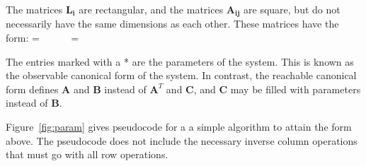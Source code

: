 The matrices $\mathbf{L_i}$ are rectangular, and the matrices
$\mathbf{A_{ij}}$ are square, but do not necessarily have the same
dimensions as each other. These matrices have the form: \vspace{-3pt}
\starteqnstar
{} =  ~~~~~
 = 
\doneeqnstar

The entries marked with a * are the parameters of the system.  This is
known as the observable canonical form of the system. In contrast, the
reachable canonical form defines $\mathbf{A}$ and $\mathbf{B}$ instead
of $\mathbf{A}^T$ and $\mathbf{C}$, and $\mathbf{C}$ may be filled
with parameters instead of $\mathbf{B}$.

Figure~\ref{fig:param} gives pseudocode for a a simple algorithm to
attain the form above.  The pseudocode does not include the necessary
inverse column operations that must go with all row operations.

\newcommand{\IND}{\begin{ALC@g}}
\newcommand{\UND}{\end{ALC@g}}

